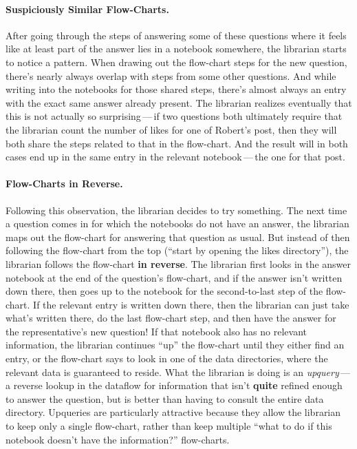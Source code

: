 \paragraph{Suspiciously Similar Flow-Charts.}
%
After going through the steps of answering some of these questions where it
feels like at least part of the answer lies in a notebook somewhere, the
librarian starts to notice a pattern. When drawing out the flow-chart steps for
the new question, there's nearly always overlap with steps from some other
questions. And while writing into the notebooks for those shared steps, there's
almost always an entry with the exact same answer already present. The librarian
realizes eventually that this is not actually so surprising\,---\,if two
questions both ultimately require that the librarian count the number of likes
for one of Robert's post, then they will both share the steps related to that in
the flow-chart. And the result will in both cases end up in the same entry in
the relevant notebook\,---\,the one for that post.

\paragraph{Flow-Charts in Reverse.}
%
Following this observation, the librarian decides to try something. The next
time a question comes in for which the notebooks do not have an answer, the
librarian maps out the flow-chart for answering that question as usual. But
instead of then following the flow-chart from the top (``start by opening the
likes directory''), the librarian follows the flow-chart \textbf{in reverse}.
The librarian first looks in the answer notebook at the end of the question's
flow-chart, and if the answer isn't written down there, then goes up to the
notebook for the second-to-last step of the flow-chart. If the relevant entry is
written down there, then the librarian can just take what's written there, do
the last flow-chart step, and then have the answer for the representative's new
question! If that notebook also has no relevant information, the librarian
continues ``up'' the flow-chart until they either find an entry, or the
flow-chart says to look in one of the data directories, where the relevant data
is guaranteed to reside. What the librarian is doing is an
\textit{upquery}\,---\,a reverse lookup in the dataflow for information that
isn't \textbf{quite} refined enough to answer the question, but is better than
having to consult the entire data directory. Upqueries are particularly
attractive because they allow the librarian to keep only a single flow-chart,
rather than keep multiple ``what to do if this notebook doesn't have the
information?'' flow-charts.

